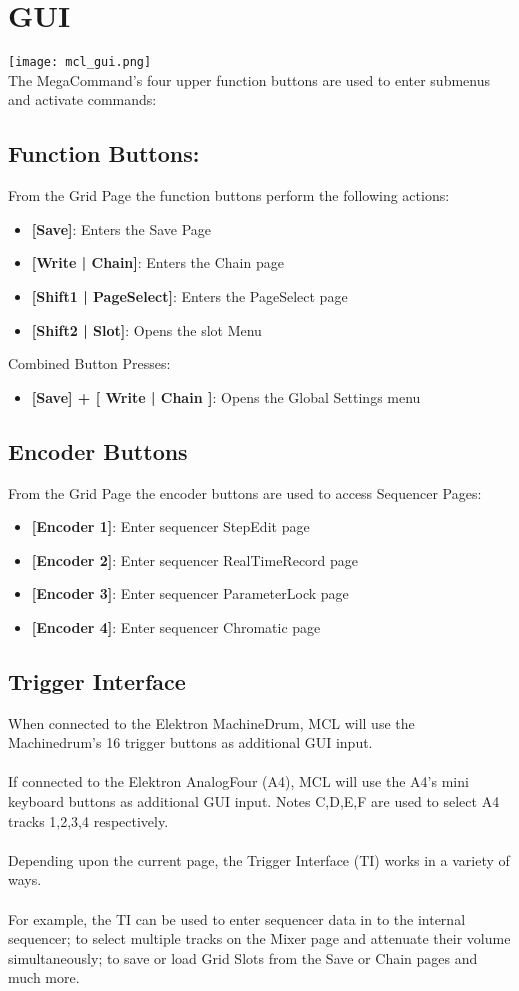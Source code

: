 \chapter{GUI}

\texttt{[image: mcl\_gui.png]}\\
The MegaCommand's four upper function buttons are used to enter submenus and activate commands:
\section{Function Buttons:}
From the Grid Page the function buttons perform the following actions:
\begin{itemize}
\item{\textbf{[Save]}: Enters the Save Page}
\item{\textbf{[Write | Chain]}: Enters the Chain page}
\item{\textbf{[Shift1 | PageSelect]}: Enters the PageSelect page}
\item{\textbf{[Shift2 | Slot]}: Opens the slot Menu }
\end{itemize}
Combined Button Presses:
\begin{itemize}
\item{\textbf{[Save] + [ Write | Chain ]}: Opens the Global Settings menu }
\end{itemize}

\section{Encoder Buttons}
From the Grid Page the encoder buttons are used to access Sequencer Pages:
\begin{itemize}
\item{\textbf{[Encoder 1]}: Enter sequencer StepEdit page}
\item{\textbf{[Encoder 2]}: Enter sequencer RealTimeRecord page}
\item{\textbf{[Encoder 3]}: Enter sequencer ParameterLock page}
\item{\textbf{[Encoder 4]}: Enter sequencer Chromatic page}

\end{itemize}
\section{Trigger Interface}
When connected to the Elektron MachineDrum, MCL will use the Machinedrum's 16 trigger buttons as additional GUI input. \\
\\
If connected to the Elektron AnalogFour (A4), MCL will use the A4's mini keyboard buttons as additional GUI input. Notes C,D,E,F are used to select A4 tracks 1,2,3,4 respectively.\\
\\
Depending upon the current page, the Trigger Interface (TI) works in a variety of ways.\\
\\For example, the TI can be used to enter sequencer data in to the internal sequencer;
to select multiple tracks on the Mixer page and attenuate their volume simultaneously; to save or load Grid Slots from the Save or Chain pages and much more.


